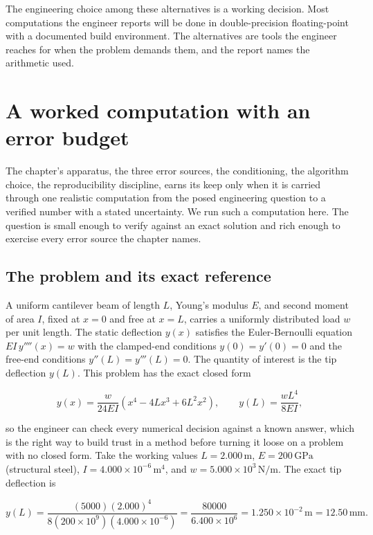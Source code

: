 The engineering choice among these alternatives is a working
decision. Most computations the engineer reports will be done in
double-precision floating-point with a documented build
environment. The alternatives are tools the engineer reaches for
when the problem demands them, and the report names the
arithmetic used.

\section{A worked computation with an error budget}

The chapter's apparatus, the three error sources, the conditioning, the
algorithm choice, the reproducibility discipline, earns its keep only when
it is carried through one realistic computation from the posed engineering
question to a verified number with a stated uncertainty. We run such a
computation here. The question is small enough to verify against an exact
solution and rich enough to exercise every error source the chapter names.

\subsection{The problem and its exact reference}

A uniform cantilever beam of length $L$, Young's modulus $E$, and
second moment of area $I$, fixed at $x = 0$ and free at $x = L$, carries
a uniformly distributed load $w$ per unit length. The static deflection
$y(x)$ satisfies the Euler-Bernoulli equation $E I\, y''''(x) = w$ with
the clamped-end conditions $y(0) = y'(0) = 0$ and the free-end conditions
$y''(L) = y'''(L) = 0$. The quantity of interest is the tip deflection
$y(L)$. This problem has the exact closed form

\[
y(x) = \frac{w}{24 E I}\left(x^{4} - 4 L x^{3} + 6 L^{2} x^{2}\right),
\qquad
y(L) = \frac{w L^{4}}{8 E I},
\]

so the engineer can check every numerical decision against a known answer,
which is the right way to build trust in a method before turning it loose
on a problem with no closed form. Take the working values $L = 2.000\,
\text{m}$, $E = 200\,\text{GPa}$ (structural steel), $I = 4.000 \times
10^{-6}\,\text{m}^{4}$, and $w = 5.000 \times 10^{3}\,\text{N}/\text{m}$.
The exact tip deflection is

\[
y(L) = \frac{(5000)(2.000)^{4}}{8 (200 \times 10^{9})(4.000 \times 10^{-6})}
= \frac{80000}{6.400 \times 10^{6}} = 1.250 \times 10^{-2}\,\text{m}
= 12.50\,\text{mm}.
\]

